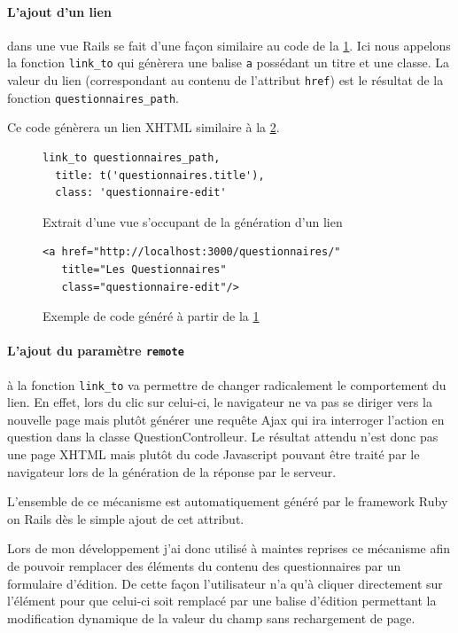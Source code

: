 \documentclass[12pt,a4paper]{book}
\begin{document}
\paragraph{L'ajout d'un lien} dans une vue Rails se fait d'une façon similaire au code de la \cref{fig.link}. Ici nous appelons la fonction \texttt{link\_to} qui génèrera une balise \texttt{a} possédant un titre et une classe. La valeur du lien (correspondant au contenu de l'attribut \texttt{href}) est le résultat de la fonction \texttt{questionnaires\_path}.

Ce code génèrera un lien XHTML similaire à la \cref{fig.link2}.

\begin{figure}[h]
\lstset{language=ruby}
\begin{lstlisting}
link_to questionnaires_path, 
  title: t('questionnaires.title'), 
  class: 'questionnaire-edit'
\end{lstlisting}
 \caption{Extrait d'une vue s'occupant de la génération d'un lien}
 \label{fig.link}
\end{figure}

\begin{figure}[h]
\lstset{language=xml}
\begin{lstlisting}
<a href="http://localhost:3000/questionnaires/" 
   title="Les Questionnaires" 
   class="questionnaire-edit"/>
\end{lstlisting}
 \caption{Exemple de code généré à partir de la \cref{fig.link}}
 \label{fig.link2}
\end{figure}

\paragraph{L'ajout du paramètre \texttt{remote}} à la fonction \texttt{link\_to} va permettre de changer radicalement le comportement du lien. En effet, lors du clic sur celui-ci, le navigateur ne va pas se diriger vers la nouvelle page mais plutôt générer une requête Ajax qui ira interroger l'action en question dans la classe QuestionControlleur. Le résultat attendu n'est donc pas une page XHTML mais plutôt du code Javascript pouvant être traité par le navigateur lors de la génération de la réponse par le serveur.

L'ensemble de ce mécanisme est automatiquement généré par le framework Ruby on Rails dès le simple ajout de cet attribut.

Lors de mon développement j'ai donc utilisé à maintes reprises ce mécanisme afin de pouvoir remplacer des éléments du contenu des questionnaires par un formulaire d'édition. De cette façon l'utilisateur n'a qu'à cliquer directement sur l'élément pour que celui-ci soit remplacé par une balise d'édition permettant la modification dynamique de la valeur du champ sans rechargement de page.  
\end{document}
